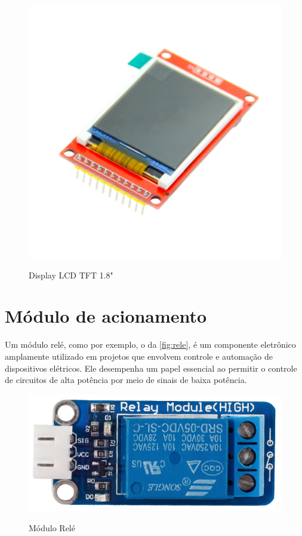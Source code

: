 \begin{figure}[h!]
    \centering
    \caption{Display LCD TFT 1.8"}
    \includegraphics[scale=0.4]{figuras/tftst7735.png}
    \label{fig:tft7735}
    \centering
\end{figure}

\section{Módulo de acionamento}\label{sec:acionamento}

Um módulo relé, como por exemplo, o da \autoref{fig:rele}, é um componente 
eletrônico amplamente utilizado em projetos que envolvem controle 
e automação de dispositivos elétricos. Ele desempenha 
um papel essencial ao permitir o controle de circuitos 
de alta potência por meio de sinais de baixa potência.

\begin{figure}[h!]
    \centering
    \caption{Módulo Relé}
    \includegraphics[scale=0.8]{figuras/rele.png}
    \label{fig:rele}
    \centering
\end{figure}

